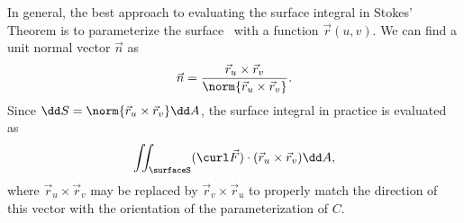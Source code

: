 In general, the best approach to evaluating the surface integral in Stokes' Theorem is to parameterize the surface \surfaceS\ with a function $\vec r(u,v)$. We can find a unit normal vector $\vec n$ as 
\[\vec n = \frac{\vec r_u\times\vec r_v}{\norm{\vec r_u\times\vec r_v}}.\]
Since $\dd S = \norm{\vec r_u\times\vec r_v}\dd A$, the surface integral in practice is evaluated as 
\[\iint_\surfaceS (\curl \vec F)\cdot (\vec r_u\times\vec r_v)\dd A,\]
where $\vec r_u\times\vec r_v$ may be replaced by $\vec r_v\times\vec r_u$ to properly match the direction of this vector with the orientation of the parameterization of $C$.



